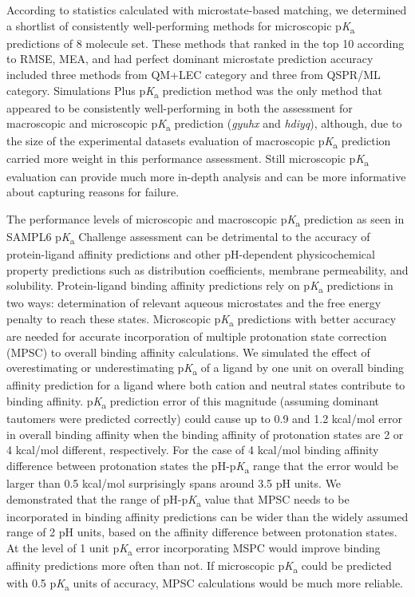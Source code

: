 \documentclass[9pt,lineno,final]{elife}
\newcommand{\pKa}{p\textit{K}\textsubscript{a}}
\begin{document}
According to statistics calculated with microstate-based matching, we determined a shortlist of consistently well-performing methods for microscopic \pKa{} predictions of 8 molecule set. These methods that ranked in the top 10 according to RMSE, MEA, and had perfect dominant microstate prediction accuracy included three methods from QM+LEC category and three from QSPR/ML category. Simulations Plus \pKa{} prediction method was the only method that appeared to be consistently well-performing in both the assessment for macroscopic and microscopic \pKa{} prediction (\textit{gyuhx} and \textit{hdiyq}), although, due to the size of the experimental datasets evaluation of macroscopic \pKa{} prediction carried more weight in this performance assessment. Still microscopic \pKa{} evaluation can provide much more in-depth analysis and can be more informative about capturing reasons for failure.

The performance levels of microscopic and macroscopic \pKa{} prediction as seen in SAMPL6 \pKa{} Challenge assessment can be detrimental to the accuracy of protein-ligand affinity predictions and other pH-dependent physicochemical property predictions such as distribution coefficients, membrane permeability, and solubility.
Protein-ligand binding affinity predictions rely on \pKa{} predictions in two ways: determination of relevant aqueous microstates and the free energy penalty to reach these states. Microscopic \pKa{} predictions with better accuracy are needed for accurate incorporation of multiple protonation state correction (MPSC) to overall binding affinity calculations. We simulated the effect of overestimating or underestimating \pKa{} of a ligand by one unit on overall binding affinity prediction for a ligand where both cation and neutral states contribute to binding affinity. 
\pKa{} prediction error of this magnitude (assuming dominant tautomers were predicted correctly) could cause up to 0.9 and 1.2 kcal/mol error in overall binding affinity when the binding affinity of protonation states are 2 or 4 kcal/mol different, respectively. 
For the case of 4 kcal/mol binding affinity difference between protonation states the pH-\pKa{} range that the error would be larger than 0.5 kcal/mol surprisingly spans around 3.5 pH units. We demonstrated that the range of pH-\pKa{} value that MPSC needs to be incorporated in binding affinity predictions can be wider than the widely assumed range of 2 pH units, based on the affinity difference between protonation states. At the level of 1 unit \pKa{} error incorporating MSPC would improve binding affinity predictions more often than not. If microscopic \pKa{} could be predicted with 0.5 \pKa{} units of accuracy, MPSC calculations would be much more reliable.
\end{document}
